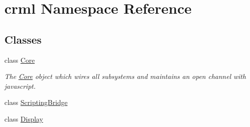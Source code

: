 \hypertarget{namespacecrml}{
\section{crml Namespace Reference}
\label{namespacecrml}
}
\subsection*{Classes}
\begin{DoxyCompactItemize}
\item 
class \hyperlink{classcrml_1_1_core}{Core}
\begin{DoxyCompactList}\small\item\em The \hyperlink{classcrml_1_1_core}{Core} object which wires all subsystems and maintains an open channel with javascript. \item\end{DoxyCompactList}\item 
class \hyperlink{classcrml_1_1_scripting_bridge}{ScriptingBridge}
\item 
class \hyperlink{classcrml_1_1_display}{Display}
\end{DoxyCompactItemize}
